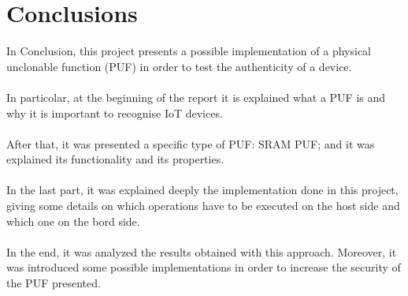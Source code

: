 \chapter{Conclusions}
In Conclusion, this project presents a possible implementation of a physical unclonable function (PUF) in order to test the authenticity of a device.
\\
\\
In particolar, at the beginning of the report it is explained what a PUF is and why it is important to recognise IoT devices.
\\
\\
After that, it was presented a specific type of PUF: SRAM PUF; and it was explained its functionality and its properties.
\\
\\
In the last part, it was explained deeply the implementation done in this project, giving some details on which operations have to be executed on the host side and which one on the bord side.
\\
\\
In the end, it was analyzed the results obtained with this approach. Moreover, it was introduced some possible implementations in order to increase the security of the PUF presented.
